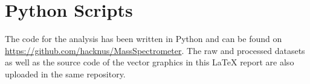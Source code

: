 \section{Python Scripts}
\label{app:python}
    The code for the analysis has been written in Python and can be found on \url{https://github.com/hacknus/MassSpectrometer}. The raw and processed datasets as well as the source code of the vector graphics in this LaTeX  report are also uploaded in the same repository.
    
  
